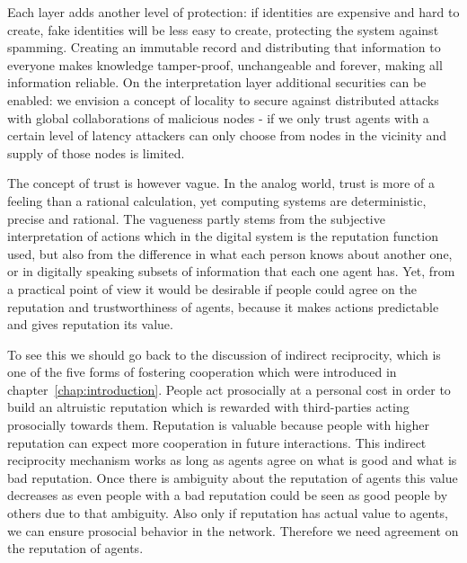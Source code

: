 
Each layer adds another level of protection: if identities are expensive and hard to create, fake 
identities will be less easy to create, protecting the system against spamming. Creating an immutable
record and distributing that information to everyone makes knowledge tamper-proof, unchangeable and 
forever, making all information reliable. On the interpretation layer additional securities can be 
enabled: we envision a concept of locality to secure against distributed attacks with global 
collaborations of malicious nodes - if we only trust agents with a certain level of latency 
attackers can only choose from nodes in the vicinity and supply of those nodes is limited. 

The concept of trust is however vague. In the analog world, trust is more of a feeling than a 
rational calculation, yet computing systems are deterministic, precise and rational. The vagueness 
partly stems from the subjective interpretation of actions which in the digital system is the 
reputation function used, but also from the difference in what each person knows about another one,
or in digitally speaking subsets of information that each one agent has. 
Yet, from a practical point of view it would be desirable if people could agree on the reputation 
and trustworthiness of agents, because it makes actions predictable and gives reputation its value. 

To see this we should go back to the discussion of indirect reciprocity, which is one of the five
forms of fostering cooperation which were introduced in chapter~\ref{chap:introduction}. People act
prosocially at a personal cost in order to build an altruistic reputation which is rewarded with 
third-parties acting prosocially towards them. Reputation is valuable because people with higher 
reputation can expect more cooperation in future interactions. This indirect reciprocity mechanism 
works as long as agents agree on what is good and what is bad reputation. Once there is ambiguity 
about the reputation of agents this value decreases as even people with a bad reputation could be 
seen as good people by others due to that ambiguity. Also only if reputation has actual value to 
agents, we can ensure prosocial behavior in the network. Therefore we need agreement on the 
reputation of agents. 

